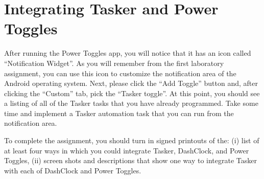 \section*{Integrating Tasker and Power Toggles}

After running the Power Toggles app, you will notice that it has an icon called ``Notification Widget''.  As you will
remember from the first laboratory assignment, you can use this icon to customize the notification area of the Android
operating system.  Next, please click the ``Add Toggle'' button and, after clicking the ``Custom'' tab, pick the
``Tasker toggle''.  At this point, you should see a listing of all of the Tasker tasks that you have already programmed.
Take some time and implement a Tasker automation task that you can run from the notification area.


To complete the assignment, you should turn in signed printouts of the: (i) list of at least four ways in which you
could integrate Tasker, DashClock, and Power Toggles, (ii) screen shots and descriptions that show one way to integrate
Tasker with each of DashClock and Power Toggles.


